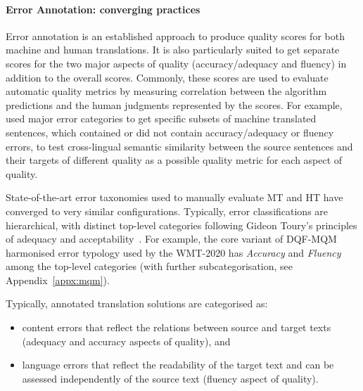\paragraph{\label{par:errors_best}Error Annotation: converging practices}
Error annotation is an established approach to produce quality scores for both machine and human translations. 
It is also particularly suited to get separate scores for the two major aspects of quality (accuracy/adequacy and fluency) in addition to the overall scores. Commonly, these scores are used to evaluate automatic quality metrics by measuring correlation between the algorithm predictions and the human judgments represented by the scores. 
For example, \citet{Ustaszewski2019} used major error categories to get specific subsets of machine translated sentences, which contained or did not contain accuracy/adequacy or fluency errors, to test cross-lingual semantic similarity between the source sentences and their targets of different quality as a possible quality metric for each aspect of quality. 

State-of-the-art error taxonomies used to manually evaluate MT and HT have converged to very similar configurations. Typically, error classifications are hierarchical, with distinct top-level categories following Gideon Toury's principles of adequacy and acceptability~\cite{Toury1995}. 
For example, the core variant of \gls{DQF}-\gls{MQM} harmonised error typology used by the WMT-2020 has \textit{Accuracy} and \textit{Fluency} among the top-level categories (with further subcategorisation, see Appendix~\ref{appx:mqm}). 

Typically, annotated translation solutions are categorised as:

\begin{itemize}\compresslist{}
	\item content errors that reflect the relations between source and target texts (adequacy and accuracy aspects of quality), and 
	\item language errors that reflect the readability of the target text and can be assessed independently of the source text (fluency aspect of quality). 
\end{itemize}

